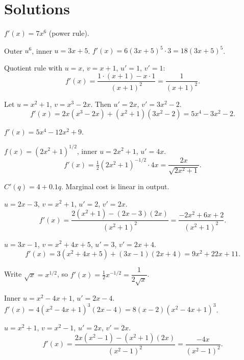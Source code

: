 \section{Solutions}

\begin{solutions}
  \item $f'(x)=7x^{6}$ (power rule).

  \item Outer $u^{6}$, inner $u=3x+5$. $f'(x)=6(3x+5)^{5}\cdot 3
        =18(3x+5)^{5}$.

  \item Quotient rule with $u=x$, $v=x+1$, $u'=1$, $v'=1$:
        \[
          f'(x)=\frac{1\cdot(x+1)-x\cdot 1}{(x+1)^{2}}=\frac{1}{(x+1)^{2}} .
        \]

  \item Let $u=x^{2}+1$, $v=x^{3}-2x$. Then $u'=2x$, $v'=3x^{2}-2$.
        \[
          f'(x)=2x(x^{3}-2x)+(x^{2}+1)(3x^{2}-2)=5x^{4}-3x^{2}-2 .
        \]

  \item $f'(x)=5x^{4}-12x^{2}+9$.

  \item $f(x)=(2x^{2}+1)^{1/2}$, inner $u=2x^{2}+1$, $u'=4x$.
        \[
          f'(x)=\tfrac12(2x^{2}+1)^{-1/2}\cdot 4x=\frac{2x}{\sqrt{2x^{2}+1}} .
        \]

  \item $C'(q)=4+0.1q$. Marginal cost is linear in output.

  \item $u=2x-3$, $v=x^{2}+1$, $u'=2$, $v'=2x$.
        \[
          f'(x)=\frac{2(x^{2}+1)-(2x-3)(2x)}{(x^{2}+1)^{2}}
               =\frac{-2x^{2}+6x+2}{(x^{2}+1)^{2}} .
        \]

  \item $u=3x-1$, $v=x^{2}+4x+5$, $u'=3$, $v'=2x+4$.
        \[
          f'(x)=3(x^{2}+4x+5)+(3x-1)(2x+4)=9x^{2}+22x+11 .
        \]

  \item Write $\sqrt{x}=x^{1/2}$, so $f'(x)=\tfrac12x^{-1/2}
        =\dfrac{1}{2\sqrt{x}}$.

  \item Inner $u=x^{2}-4x+1$, $u'=2x-4$. $f'(x)=4(x^{2}-4x+1)^{3}(2x-4)
        =8(x-2)(x^{2}-4x+1)^{3}$.

  \item $u=x^{2}+1$, $v=x^{2}-1$, $u'=2x$, $v'=2x$.
        \[
          f'(x)=\frac{2x(x^{2}-1)-(x^{2}+1)(2x)}{(x^{2}-1)^{2}}
               =\frac{-4x}{(x^{2}-1)^{2}} .
        \]


\end{solutions}
